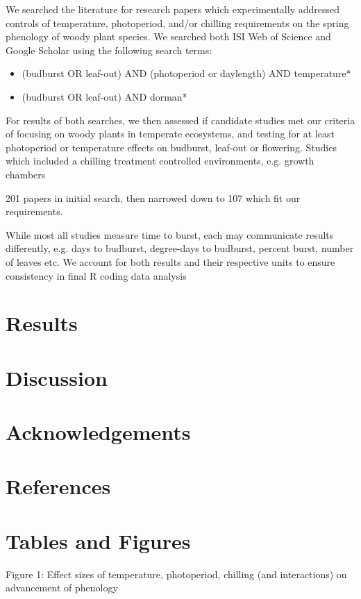 \documentclass[11pt]{article}
\begin{document}
We searched the literature for research papers which experimentally addressed controls of temperature, photoperiod, and/or chilling requirements on the spring phenology of woody plant species. We searched both ISI Web of Science and Google Scholar using the following search terms:
\begin{itemize}
\item{ (budburst OR leaf-out) AND (photoperiod or daylength) AND temperature* }
\item{ (budburst OR leaf-out) AND dorman*  }
\end{itemize}

For results of both searches, we then assessed if candidate studies met our criteria of focusing on woody plants in temperate ecosystems, and testing for at least photoperiod or temperature effects on budburst, leaf-out or flowering. Studies which included a chilling treatment 
 controlled environments, e.g. growth chambers
 
 201 papers in initial search, then narrowed down to 107 which fit our requirements.
 
 While most all studies measure time to burst, each may communicate results differently, e.g. days to budburst, degree-days to budburst, percent burst, number of leaves etc.
We account for both results and their respective units to ensure consistency in final R coding data analysis



\section*{Results}

\section*{Discussion}

\section*{Acknowledgements}

\section*{References}

\section*{Tables and Figures}

Figure 1: Effect sizes of temperature, photoperiod, chilling (and interactions) on advancement of phenology
\end{document}
